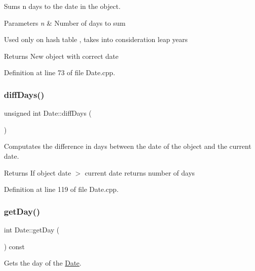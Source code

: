 Sums n days to the date in the object. 


\begin{DoxyParams}{Parameters}
{\em n} & Number of days to sum\\
\hline
\end{DoxyParams}
Used only on hash table , takes into consideration leap years

\begin{DoxyReturn}{Returns}
New object with correct date 
\end{DoxyReturn}


Definition at line 73 of file Date.\+cpp.

\hypertarget{class_date_a93d53878c07ee506c78971b762a47265}{}\label{class_date_a93d53878c07ee506c78971b762a47265} 
\subsubsection{\texorpdfstring{diff\+Days()}{diffDays()}}
{\footnotesize\ttfamily unsigned int Date\+::diff\+Days (\begin{DoxyParamCaption}{ }\end{DoxyParamCaption})}



Computates the difference in days between the date of the object and the current date. 

\begin{DoxyReturn}{Returns}
If object date $>$ current date returns number of days 
\end{DoxyReturn}


Definition at line 119 of file Date.\+cpp.

\hypertarget{class_date_a0f253815240e70f4c39cb93cc68bd3f4}{}\label{class_date_a0f253815240e70f4c39cb93cc68bd3f4} 
\subsubsection{\texorpdfstring{get\+Day()}{getDay()}}
{\footnotesize\ttfamily int Date\+::get\+Day (\begin{DoxyParamCaption}{ }\end{DoxyParamCaption}) const\hspace{0.3cm}{\ttfamily [inline]}}



Gets the day of the \hyperlink{class_date}{Date}. 


